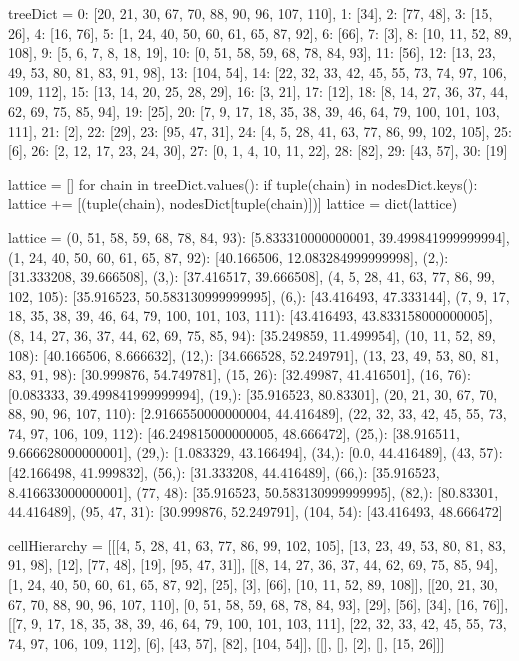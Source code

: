 treeDict =  {
 0: [20, 21, 30, 67, 70, 88, 90, 96, 107, 110],
 1: [34],
 2: [77, 48],
 3: [15, 26],
 4: [16, 76],
 5: [1, 24, 40, 50, 60, 61, 65, 87, 92],
 6: [66],
 7: [3],
 8: [10, 11, 52, 89, 108],
 9: [5, 6, 7, 8, 18, 19],
 10: [0, 51, 58, 59, 68, 78, 84, 93],
 11: [56],
 12: [13, 23, 49, 53, 80, 81, 83, 91, 98],
 13: [104, 54],
 14: [22, 32, 33, 42, 45, 55, 73, 74, 97, 106, 109, 112],
 15: [13, 14, 20, 25, 28, 29],
 16: [3, 21],
 17: [12],
 18: [8, 14, 27, 36, 37, 44, 62, 69, 75, 85, 94],
 19: [25],
 20: [7, 9, 17, 18, 35, 38, 39, 46, 64, 79, 100, 101, 103, 111],
 21: [2],
 22: [29],
 23: [95, 47, 31],
 24: [4, 5, 28, 41, 63, 77, 86, 99, 102, 105],
 25: [6],
 26: [2, 12, 17, 23, 24, 30],
 27: [0, 1, 4, 10, 11, 22],
 28: [82],
 29: [43, 57],
 30: [19]
}



lattice = []
for chain in treeDict.values():
	if tuple(chain) in nodesDict.keys():
		lattice += [(tuple(chain), nodesDict[tuple(chain)])]
lattice = dict(lattice)
	
	
lattice = {
 (0, 51, 58, 59, 68, 78, 84, 93): [5.833310000000001, 39.499841999999994],
 (1, 24, 40, 50, 60, 61, 65, 87, 92): [40.166506, 12.083284999999998],
 (2,): [31.333208, 39.666508],
 (3,): [37.416517, 39.666508],
 (4, 5, 28, 41, 63, 77, 86, 99, 102, 105): [35.916523, 50.583130999999995],
 (6,): [43.416493, 47.333144],
 (7, 9, 17, 18, 35, 38, 39, 46, 64, 79, 100, 101, 103, 111): [43.416493,
  43.833158000000005],
 (8, 14, 27, 36, 37, 44, 62, 69, 75, 85, 94): [35.249859, 11.499954],
 (10, 11, 52, 89, 108): [40.166506, 8.666632],
 (12,): [34.666528, 52.249791],
 (13, 23, 49, 53, 80, 81, 83, 91, 98): [30.999876, 54.749781],
 (15, 26): [32.49987, 41.416501],
 (16, 76): [0.083333, 39.499841999999994],
 (19,): [35.916523, 80.83301],
 (20, 21, 30, 67, 70, 88, 90, 96, 107, 110): [2.9166550000000004, 44.416489],
 (22, 32, 33, 42, 45, 55, 73, 74, 97, 106, 109, 112): [46.249815000000005,
  48.666472],
 (25,): [38.916511, 9.666628000000001],
 (29,): [1.083329, 43.166494],
 (34,): [0.0, 44.416489],
 (43, 57): [42.166498, 41.999832],
 (56,): [31.333208, 44.416489],
 (66,): [35.916523, 8.416633000000001],
 (77, 48): [35.916523, 50.583130999999995],
 (82,): [80.83301, 44.416489],
 (95, 47, 31): [30.999876, 52.249791],
 (104, 54): [43.416493, 48.666472]
}


cellHierarchy = [[[4, 5, 28, 41, 63, 77, 86, 99, 102, 105],
  [13, 23, 49, 53, 80, 81, 83, 91, 98],
  [12],
  [77, 48],
  [19],
  [95, 47, 31]],
 [[8, 14, 27, 36, 37, 44, 62, 69, 75, 85, 94],
  [1, 24, 40, 50, 60, 61, 65, 87, 92],
  [25],
  [3],
  [66],
  [10, 11, 52, 89, 108]],
 [[20, 21, 30, 67, 70, 88, 90, 96, 107, 110],
  [0, 51, 58, 59, 68, 78, 84, 93],
  [29],
  [56],
  [34],
  [16, 76]],
 [[7, 9, 17, 18, 35, 38, 39, 46, 64, 79, 100, 101, 103, 111],
  [22, 32, 33, 42, 45, 55, 73, 74, 97, 106, 109, 112],
  [6],
  [43, 57],
  [82],
  [104, 54]],
 [[], [], [2], [], [15, 26]]]

	
	